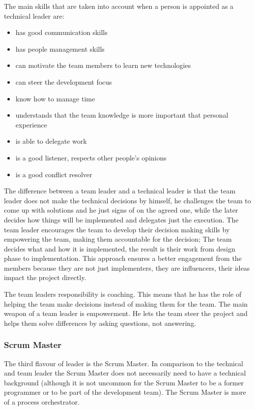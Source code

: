 The main skills that are taken into account when a person is appointed as a technical leader are:

\begin{itemize}
\item has good communication skills
\item has people management skills
\item can motivate the team members to learn new technologies
\item can steer the development focus
\item know how to manage time
\item understands that the team knowledge is more important that personal experience
\item is able to delegate work
\item is a good listener, respects other people's opinions
\item is a good conflict resolver
\end{itemize}

The difference between a team leader and a technical leader is that the team leader does not make the technical decisions by himself, he challenges the team to come up with solutions and he just signs of on the agreed one, while the later decides how things will be implemented and delegates just the execution. The team leader encourages the team to develop their decision making skills by empowering the team, making them accountable for the decision; The team decides what and how it is implemented, the result is their work from design phase to implementation. This approach ensures a better engagement from the members because they are not just implementers, they are influencers, their ideas impact the project directly.

The team leaders responsibility is coaching. This means that he has the role of helping the team make decisions instead of making them for the team. The main weapon of a team leader is empowerment. He lets the team steer the project and helps them solve differences by asking questions, not answering.

\subsubsection{Scrum Master}
The third flavour of leader is the Scrum Master. In comparison to the technical and team leader the Scrum Master does not necessarily need to have a technical background (although it is not uncommon for the Scrum Master to be a former programmer or to be part of the development team). The Scrum Master is more of a process orchestrator.

